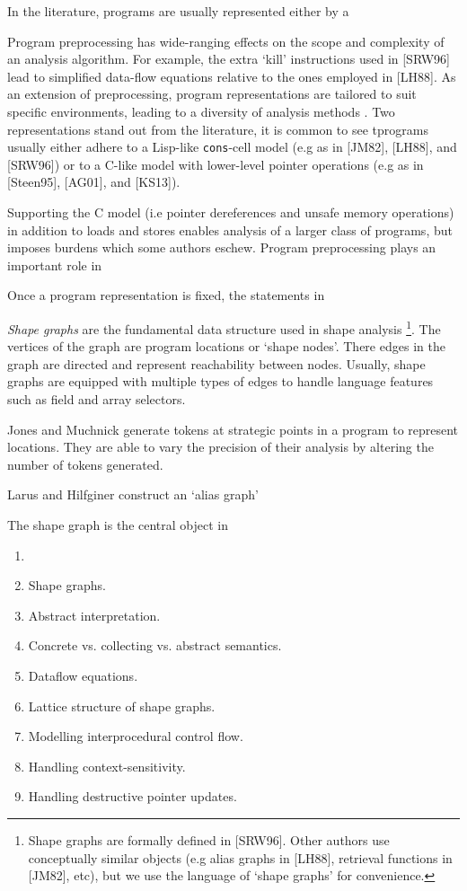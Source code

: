 \documentclass{article}
\begin{document}
In the literature, programs are usually represented either by a 

Program preprocessing has wide-ranging effects on the scope and complexity
of an analysis algorithm. For example, the extra `kill' instructions used in
[SRW96] lead to simplified data-flow equations relative to the ones employed
in [LH88]. As an extension of preprocessing, program representations are
tailored to suit specific environments, leading to 
a diversity of analysis methods
. Two representations stand out from the literature, it is common to see tprograms usually either adhere to a
Lisp-like \texttt{cons}-cell model (e.g as in [JM82], [LH88], and [SRW96])
or to a C-like model with lower-level pointer operations (e.g as in
[Steen95], [AG01], and [KS13]). 

Supporting the C model (i.e pointer
dereferences and unsafe memory operations) in addition to loads and stores
enables analysis of a larger class of programs, but imposes burdens which
some authors eschew. Program preprocessing plays an important role in 

Once a program representation is fixed, the statements in 

\textit{Shape graphs} are the fundamental data structure used in shape
analysis 
    \footnote{Shape graphs are formally defined in [SRW96]. Other authors
        use conceptually similar objects (e.g alias graphs in [LH88],
        retrieval functions in [JM82], etc), but we use the language of
    `shape graphs' for convenience.}.
The vertices of the graph are program locations or `shape nodes'.
There edges in the graph are directed and represent reachability between
nodes. Usually, shape graphs are equipped with multiple types of edges to
handle language features such as field and array selectors.

    Jones and Muchnick generate tokens at strategic points in a program to
    represent locations. They are able to vary the precision of their
    analysis by altering the number of tokens generated. 

    Larus and Hilfginer construct an `alias graph'

The shape graph is the central object in 

\begin{enumerate}[1.]
    \item     \item Shape graphs.
    \item Abstract interpretation.
    \item Concrete vs. collecting vs. abstract semantics.
    \item Dataflow equations.
    \item Lattice structure of shape graphs.
    \item Modelling interprocedural control flow.
    \item Handling context-sensitivity.
    \item Handling destructive pointer updates.
\end{enumerate}
\end{document}
